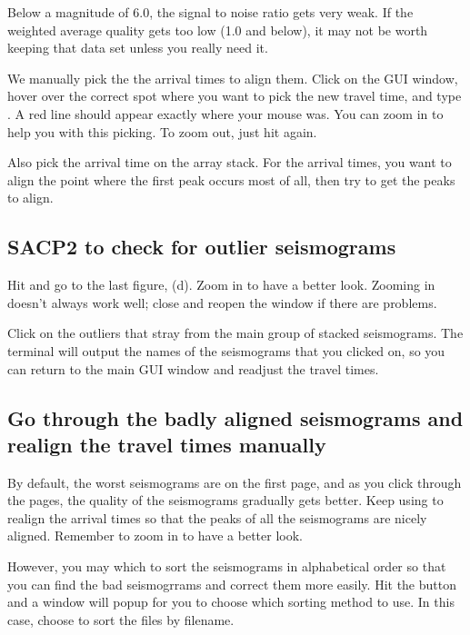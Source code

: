 \documentclass[letterpaper,10pt,english]{sphinxmanual}
\begin{document}
Below a magnitude of 6.0, the signal to noise ratio gets very weak. If the weighted average quality gets too low (1.0 and below), it may not be worth keeping that data set unless you really need it.

We manually pick the the arrival times to align them. Click on the GUI window, hover over the correct spot where you want to pick the new travel time, and type . A red line should appear exactly where your mouse was. You can zoom in to help you with this picking. To zoom out, just hit  again.

Also pick the arrival time on the array stack. For the arrival times, you want to align the point where the first peak occurs most of all, then try to get the peaks to align.


\subsection{SACP2 to check for outlier seismograms}
\label{docfiles/PickingTravelTimes:sacp2-to-check-for-outlier-seismograms}
Hit and go to the last figure, (d). Zoom in to have a better look. Zooming in doesn’t always work well; close and reopen the  window if there are problems.

Click on the outliers that stray from the main group of stacked seismograms. The terminal will output the names of the seismograms that you clicked on, so you can return to the main GUI window and readjust the travel times.


\subsection{Go through the badly aligned seismograms and realign the travel times manually}
\label{docfiles/PickingTravelTimes:go-through-the-badly-aligned-seismograms-and-realign-the-travel-times-manually}
By default, the worst seismograms are on the first page, and as you click through the pages, the quality of the seismograms gradually gets better. Keep using  to realign the arrival times so that the peaks of all the seismograms are nicely aligned. Remember to zoom in to have a better look.

However, you may which to sort the seismograms in alphabetical order so that you can find the bad seismogrrams and correct them more easily. Hit the  button and a window will popup for you to choose which sorting method to use. In this case, choose to sort the files by filename.
\end{document}

